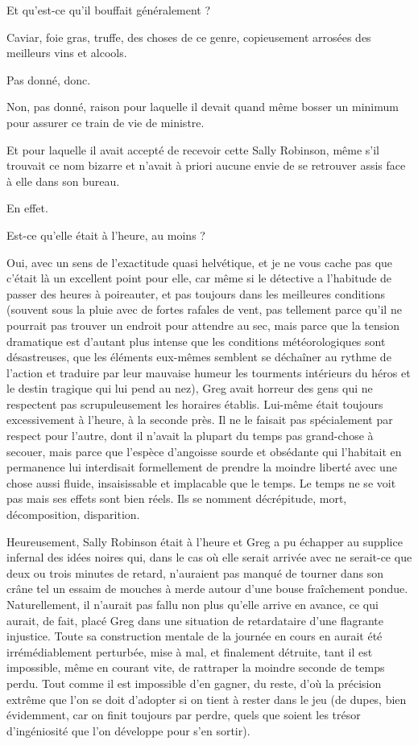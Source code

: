 Et qu’est-ce qu’il bouffait généralement ?

Caviar, foie gras, truffe, des choses de ce genre, copieusement arrosées des meilleurs vins et alcools.

Pas donné, donc.

Non, pas donné, raison pour laquelle il devait quand même bosser un minimum pour assurer ce train de vie de ministre.

Et pour laquelle il avait accepté de recevoir cette Sally Robinson, même s’il trouvait ce nom bizarre et n’avait à priori aucune envie de se retrouver assis face à elle dans son bureau.

En effet.

Est-ce qu’elle était à l’heure, au moins ?

Oui, avec un sens de l’exactitude quasi helvétique, et je ne vous cache pas que c’était là un excellent point pour elle, car même si le détective a l’habitude de passer des heures à poireauter, et pas toujours dans les meilleures conditions (souvent sous la pluie avec de fortes rafales de vent, pas tellement parce qu’il ne pourrait pas trouver un endroit pour attendre au sec, mais parce que la tension dramatique est d’autant plus intense que les conditions météorologiques sont désastreuses, que les éléments eux-mêmes semblent se déchaîner au rythme de l’action et traduire par leur mauvaise humeur les tourments intérieurs du héros et le destin tragique qui lui pend au nez), Greg avait horreur des gens qui ne respectent pas scrupuleusement les horaires établis. Lui-même était toujours excessivement à l’heure, à la seconde près. Il ne le faisait pas spécialement par respect pour l’autre, dont il n’avait la plupart du temps pas grand-chose à secouer, mais parce que l’espèce d’angoisse sourde et obsédante qui l’habitait en permanence lui interdisait formellement de prendre la moindre liberté avec une chose aussi fluide, insaisissable et implacable que le temps. Le temps ne se voit pas mais ses effets sont bien réels. Ils se nomment décrépitude, mort, décomposition, disparition.

Heureusement, Sally Robinson était à l’heure et Greg a pu échapper au supplice infernal des idées noires qui, dans le cas où elle serait arrivée avec ne serait-ce que deux ou trois minutes de retard, n’auraient pas manqué de tourner dans son crâne tel un essaim de mouches à merde autour d’une bouse fraîchement pondue. Naturellement, il n’aurait pas fallu non plus qu’elle arrive en avance, ce qui aurait, de fait, placé Greg dans une situation de retardataire d’une flagrante injustice. Toute sa construction mentale de la journée en cours en aurait été irrémédiablement perturbée, mise à mal, et finalement détruite, tant il est impossible, même en courant vite, de rattraper la moindre seconde de temps perdu. Tout comme il est impossible d’en gagner, du reste, d’où la précision extrême que l’on se doit d’adopter si on tient à rester dans le jeu (de dupes, bien évidemment, car on finit toujours par perdre, quels que soient les trésor d’ingéniosité que l’on développe pour s’en sortir).

